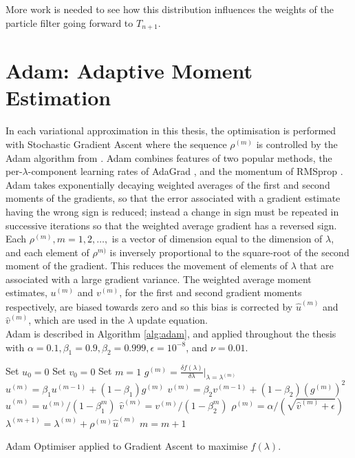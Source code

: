 \documentclass[
12pt, %
onehalfspacing, %
nohyperref, %
headsepline, %
chapterinoneline, %
]{MastersDoctoralThesis} %
\begin{document}
More work is needed to see how this distribution influences the weights of the particle filter going forward to $T_{n+1}$.

\fi





\appendix
{}
\chapter{Adam: Adaptive Moment Estimation}

In each variational approximation in this thesis, the optimisation is performed with Stochastic Gradient Ascent where the sequence $\rho^{(m)}$ is controlled by the Adam algorithm from \citet{Kingma2014b}. Adam combines features of two popular methods, the per-$\lambda$-component learning rates of AdaGrad \citep{Duchi2011}, and the momentum of RMSprop \citep{Tieleman2012}.
\\

 Adam takes exponentially decaying weighted averages of the first and second moments of the gradients, so that the error associated with a gradient estimate having the wrong sign is reduced; instead a change in sign must be repeated in successive iterations so that the weighted average gradient has a reversed sign.
\\

Each $\rho^{(m)}, m = 1, 2, \ldots, $ is a vector of dimension equal to the dimension of $\lambda$, and each element of $\rho^{m)}$ is inversely proportional to the square-root of the second moment of the gradient. This reduces the movement of elements of $\lambda$ that are associated with a large gradient variance. The weighted average moment estimates, $u^{(m)}$ and $v^{(m)}$, for the first and second gradient moments respectively, are biased towards zero and so this bias is corrected by $\hat{u}^{(m)}$ and $\hat{v}^{(m)}$, which are used in the $\lambda$ update equation. 
\\

 Adam is described in Algorithm \ref{alg:adam}, and applied throughout the thesis with $\alpha = 0.1, \beta_1 = 0.9, \beta_2 = 0.999, \epsilon = 10^{-8}$, and $\nu = 0.01$.
\\

\begin{algorithm}[H]
 Set $u_0 = 0$\;
 Set $v_0 = 0$\;
 Set $m = 1$\;
  {
  $g^{(m)} = \frac{\delta f(\lambda)}{\delta \lambda} \rvert_{\lambda = \lambda^{(m)}}$ \;
  $u^{(m)} = \beta_1 u^{(m-1)} + (1-\beta_1) g^{(m)}$ \;
  $v^{(m)} = \beta_2 v^{(m-1)} + (1-\beta_2) (g^{(m)})^2$ \;
  $\hat{u}^{(m)} = u^{(m)} / (1 - \beta_1^m)$ \;
  $\hat{v}^{(m)} = v^{(m)} / (1 - \beta_2^m)$ \;
  $\rho^{(m)} = \alpha / (\sqrt{\hat{v}^{(m)} + \epsilon})$\;
  $\lambda^{(m+1)} = \lambda^{(m)} + \rho^{(m)} \hat{u}^{(m)}$\;
  $m = m + 1$\;
  }
 \caption{Adam Optimiser applied to Gradient Ascent to maximise $f(\lambda)$.}
  \label{alg:adam}
\end{algorithm}
\end{document}
